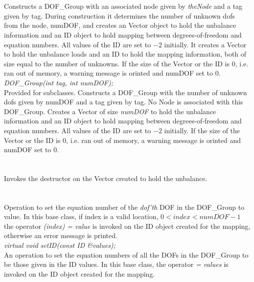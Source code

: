   \\
  \\
Constructs a  DOF\_Group with an associated node given by {\em
theNode} and a tag given by \p tag. During construction it
determines the number of unknown dofs from the node, \p numDOF, and
creates an Vector object to hold the unbalance information and an ID
object to hold mapping between degrees-of-freedom and equation
numbers. All values of the ID are set to $-2$ initially. It creates a
Vector to hold the unbalance loads and an ID to 
hold the mapping information, both of size equal to the number of
unknowns. If the size of the Vector or the ID is $0$, i.e. ran out of
memory, a warning message is orinted and \p numDOF set to $0$. \\

{\em DOF\_Group(int tag, int numDOF);}  \\
Provided for subclasses. Constructs a  DOF\_Group with the number of
unknown dofs given by \p numDOF and a tag given by \p tag. No
Node is associated with this DOF\_Group. Creates a Vector of size {\em
numDOF} to hold the unbalance information and an ID object to
hold mapping between degrees-of-freedom and equation numbers. All
values of the ID are set to $-2$ initially. If
the size of the Vector or the ID is $0$, i.e. ran out of memory, a
warning message is orinted and \p numDOF set to $0$. \\

  \\
  \\
Invokes the destructor on the Vector created to hold the unbalance. \\

  \\
 \\
Operation to set the equation number of the {\em dof'th} DOF in the
DOF\_Group to \p value. In this base class, if \p index is a
valid location, $0 < index < numDOF-1$ the operator {\em (index) =
value} is invoked on the ID object created for the mapping, otherwise
an error message is printed. \\ 


{\em virtual void setID(const ID \&values);} \\
An operation to set the equation numbers of all the DOFs in the
DOF\_Group to be those given in the ID \p values. In this base
class, the operator {\em = values} is invoked on the ID object created
for the mapping. \\ 

